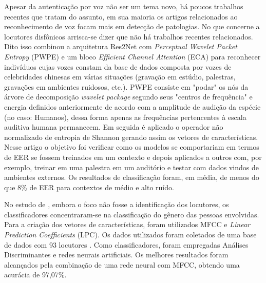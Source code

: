 			\par Apesar da autenticação por voz não ser um tema novo, há poucos trabalhos recentes que tratam do assunto, em sua maioria os artigos relacionados ao reconhecimento de voz focam mais em detecção de patologias. No que concerne a locutores disfônicos arrisca-se dizer que não há trabalhos recentes relacionados. Dito isso \cite{math11194205} combinou a arquitetura Res2Net \cite{gao2019res2net} com \textit{Perceptual Wavelet Packet Entropy} (PWPE) e um bloco \textit{Efficient Channel Attention} (ECA) \cite{DBLP:journals/corr/abs-1910-03151} para reconhecer indivíduos cujas vozes constam da base de dados \cite{fan2020cn} composta por vozes de celebridades chinesas em várias situações (gravação em estúdio, palestras, gravações em ambientes ruidosos, etc.). PWPE consiste em "podar" os nós da árvore de decomposição \textit{wavelet package} segundo seus "centros de frequência" e energia definidos anteriormente de acordo com a amplitude de audição da espécie (no caso: Humanos), dessa forma apenas as frequências pertencentes à escala auditiva humana permanecem. Em seguida é aplicado o operador não normalizado de entropia de Shannon gerando assim os vetores de características. Nesse artigo o objetivo foi verificar como os modelos se comportariam em termos de EER se fossem treinados em um contexto e depois aplicados a outros com, por exemplo, treinar em uma palestra em um auditório e testar com dados vindos de ambientes externos. Os resultados de classificação foram, em média, de menos do que 8\% de EER para contextos de médio e alto ruído.
			
			\par No estudo de \cite{ali2022speech}, embora o foco não fosse a identificação dos locutores, os classificadores concentraram-se na classificação do gênero das pessoas envolvidas. Para a criação dos vetores de características, foram utilizados MFCC e \textit{Linear Prediction Coefficients} (LPC). Os dados utilizados foram coletados de uma base de dados com 93 locutores \cite{10.1121/1.411872}. Como classificadores, foram empregadas Análises Discriminantes e redes neurais artificiais. Os melhores resultados foram alcançados pela combinação de uma rede neural com MFCC, obtendo uma acurácia de 97,07\%.
			
			


